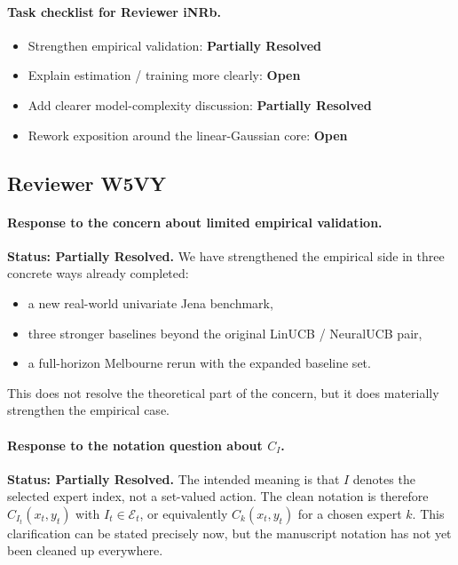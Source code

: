 \documentclass[11pt]{article}
\newcommand{\partialresolved}{\textbf{Partially Resolved}}
\newcommand{\openissue}{\textbf{Open}}
\begin{document}
\paragraph{Task checklist for Reviewer iNRb.}
\begin{itemize}[leftmargin=1.5em]
    \item Strengthen empirical validation: \partialresolved
    \item Explain estimation / training more clearly: \openissue
    \item Add clearer model-complexity discussion: \partialresolved
    \item Rework exposition around the linear-Gaussian core: \openissue
\end{itemize}

\subsection*{Reviewer W5VY}

\paragraph{Response to the concern about limited empirical validation.}
\textbf{Status: \partialresolved.}
We have strengthened the empirical side in three concrete ways already completed:
\begin{itemize}[leftmargin=1.5em]
    \item a new real-world univariate Jena benchmark,
    \item three stronger baselines beyond the original LinUCB / NeuralUCB pair,
    \item a full-horizon Melbourne rerun with the expanded baseline set.
\end{itemize}
This does not resolve the theoretical part of the concern, but it does materially strengthen the empirical case.

\paragraph{Response to the notation question about $C_I$.}
\textbf{Status: \partialresolved.}
The intended meaning is that $I$ denotes the selected expert index, not a set-valued action. The clean notation is therefore $C_{I_t}(x_t,y_t)$ with $I_t \in \mathcal{E}_t$, or equivalently $C_k(x_t,y_t)$ for a chosen expert $k$. This clarification can be stated precisely now, but the manuscript notation has not yet been cleaned up everywhere.
\end{document}
